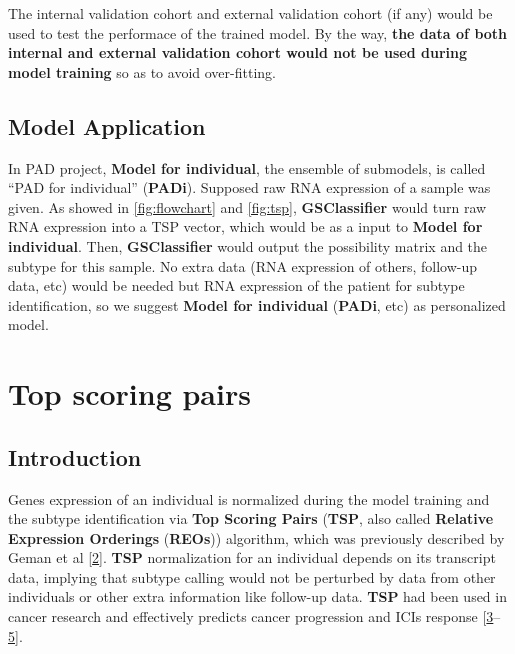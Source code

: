 \documentclass[
  12pt,
]{book}
\begin{document}
The internal validation cohort and external validation cohort (if any) would be used to test the performace of the trained model. By the way, \textbf{the data of both internal and external validation cohort would not be used during model training} so as to avoid over-fitting.

\hypertarget{model-application}{%
\subsection{Model Application}\label{model-application}}

In PAD project, \textbf{Model for individual}, the ensemble of submodels, is called ``PAD for individual'' (\textbf{PADi}). Supposed raw RNA expression of a sample was given. As showed in \ref{fig:flowchart} and \ref{fig:tsp}, \textbf{GSClassifier} would turn raw RNA expression into a TSP vector, which would be as a input to \textbf{Model for individual}. Then, \textbf{GSClassifier} would output the possibility matrix and the subtype for this sample. No extra data (RNA expression of others, follow-up data, etc) would be needed but RNA expression of the patient for subtype identification, so we suggest \textbf{Model for individual} (\textbf{PADi}, etc) as personalized model.

\hypertarget{topicTSP}{%
\section{Top scoring pairs}\label{topicTSP}}

\hypertarget{tsp-intro}{%
\subsection{Introduction}\label{tsp-intro}}

Genes expression of an individual is normalized during the model training and the subtype identification via \textbf{Top Scoring Pairs} (\textbf{TSP}, also called \textbf{Relative Expression Orderings} (\textbf{REOs})) algorithm, which was previously described by Geman et al {[}\protect\hyperlink{ref-RN267}{2}{]}. \textbf{TSP} normalization for an individual depends on its transcript data, implying that subtype calling would not be perturbed by data from other individuals or other extra information like follow-up data. \textbf{TSP} had been used in cancer research and effectively predicts cancer progression and ICIs response {[}\protect\hyperlink{ref-RN265}{3}--\protect\hyperlink{ref-RN261}{5}{]}.
\end{document}
